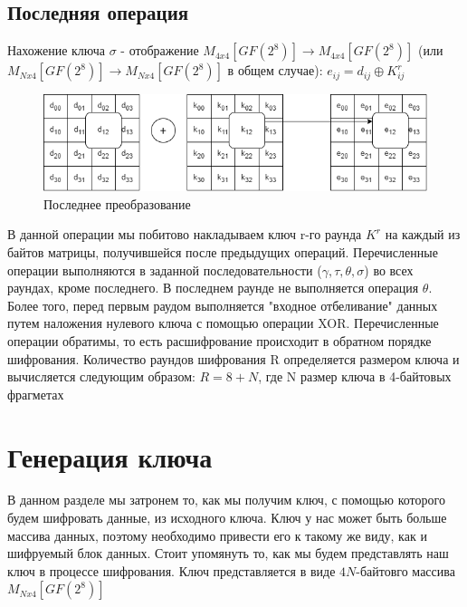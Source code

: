 \documentclass[12pt]{article}
\begin{document}
\subsection{Последняя операция}
Нахожение ключа $\sigma$ - отображение $M_{4x4}[GF(2^{8})] \to M_{4x4}[GF(2^{8})]$ (или $M_{Nx4}[GF(2^{8})] \to M_{Nx4}[GF(2^{8})]$ в общем случае): \newline
$e_{ij} = d_{ij} \oplus K^{r}_{ij}$

\begin{figure}[h]
    \centering
    \includegraphics[width=0.7\linewidth]{last_func.png}
    \caption{Последнее преобразование}
    \label{fig:scheme}
\end{figure}

\newline
В данной операции мы побитово накладываем ключ r-го раунда $K^{r}$ на каждый из байтов матрицы, получившейся после предыдущих операций. 
\newline
\newline
Перечисленные операции выполняются в заданной последовательности ($\gamma, \tau, \theta, \sigma$) во всех раундах, кроме последнего. В последнем раунде не выполняется операция $\theta$. Более того, перед первым раудом выполняется "входное отбеливание" данных путем наложения нулевого ключа с помощью операции XOR. Перечисленные операции обратимы, то есть расшифрование происходит в обратном порядке шифрования.
Количество раундов шифрования R определяется размером ключа и вычисляется следующим образом: $R = 8 + N$, где N размер ключа в 4-байтовых фрагметах



\section{Генерация ключа}
В данном разделе мы затронем то, как мы получим ключ, с помощью которого будем шифровать данные, из исходного ключа. Ключ у нас может быть больше массива данных, поэтому необходимо привести его к такому же виду, как и шифруемый блок данных. Стоит упомянуть то, как мы будем представлять наш ключ в процессе шифрования. Ключ представляется в виде $4N$-байтовго массива $M_{Nx4}[GF(2^{8})]$
\end{document}
